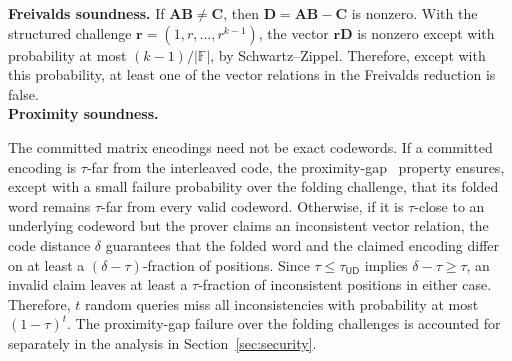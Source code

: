 \documentclass[conference,compsoc]{IEEEtran}
\newif\ifshowrevisions
\newenvironment{revblock}[1][]
  {%
    \ifshowrevisions
      \begin{tcolorbox}[
        breakable,
        colback=revisionyellow,
        colframe=revisionyellow,
        boxrule=0pt,
        arc=0pt,
        left=2pt,
        right=2pt,
        top=2pt,
        bottom=2pt,
        before skip=2pt,
        after skip=2pt,
        #1
      ]
    \fi
  }
  {%
    \ifshowrevisions
      \end{tcolorbox}
    \fi
  }
\newcommand{\mat}{\mathbf}          %
\newcommand{\vect}{\mathbf}         %
\newcommand{\ud}{{\mathsf{UD}}}
\theoremstyle{plain}
\theoremstyle{definition}
\theoremstyle{remark}
\begin{document}
\noindent\textbf{Freivalds soundness.}
If \(\mat{A}\mat{B}\neq\mat{C}\), then
\(\mat{D}=\mat{A}\mat{B}-\mat{C}\) is nonzero.  With the structured challenge
\(\vect{r}=(1,r,\ldots,r^{k-1})\), the vector
\(\vect{r}\mat{D}\) is nonzero except with probability at most
\((k-1)/|\mathbb{F}|\), by Schwartz--Zippel.  Therefore, except with this
probability, at least one of the vector relations in the Freivalds reduction is
false. \\

\noindent\textbf{Proximity soundness.}
\begin{revblock}
  The committed matrix encodings need not be exact codewords. If a committed
encoding is $\tau$-far from the interleaved code, the proximity-gap~\cite{proximity_gaps} property
ensures, except with a small failure probability over the folding challenge,
that its folded word remains $\tau$-far from every valid codeword.
Otherwise, if it is $\tau$-close to an underlying codeword but the prover
claims an inconsistent vector relation, the code distance $\delta$ guarantees
that the folded word and the claimed encoding differ on at least a
$(\delta-\tau)$-fraction of positions. Since
$\tau\leq\tau_{\ud}$ implies $\delta-\tau\geq\tau$, an invalid claim leaves
at least a $\tau$-fraction of inconsistent positions in either case. Therefore, $t$ random queries miss all inconsistencies with probability at
most $(1-\tau)^t$.
The proximity-gap failure over the folding challenges is accounted for
separately in the analysis in Section~\ref{sec:security}. \\
\end{revblock}
\end{document}
